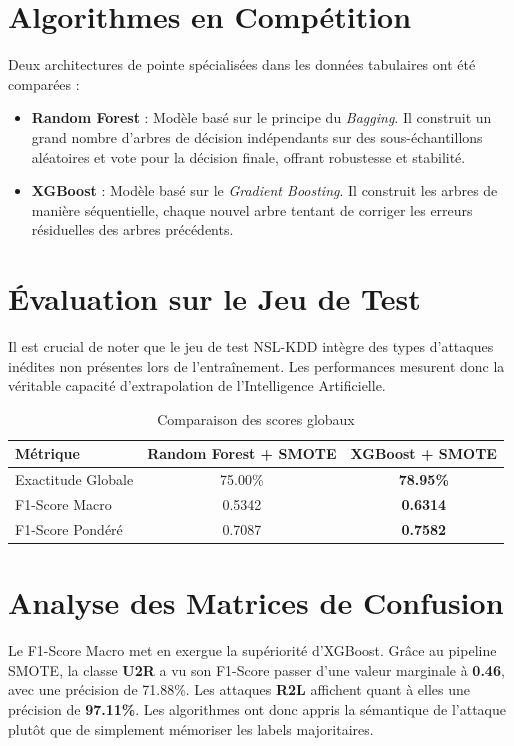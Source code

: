 \documentclass[12pt,a4paper]{report}
\begin{document}
\section{Algorithmes en Compétition}
Deux architectures de pointe spécialisées dans les données tabulaires ont été comparées :
\begin{itemize}
    \item \textbf{Random Forest} : Modèle basé sur le principe du \textit{Bagging}. Il construit un grand nombre d'arbres de décision indépendants sur des sous-échantillons aléatoires et vote pour la décision finale, offrant robustesse et stabilité.
    \item \textbf{XGBoost} : Modèle basé sur le \textit{Gradient Boosting}. Il construit les arbres de manière séquentielle, chaque nouvel arbre tentant de corriger les erreurs résiduelles des arbres précédents.
\end{itemize}

\section{Évaluation sur le Jeu de Test}
Il est crucial de noter que le jeu de test NSL-KDD intègre des types d'attaques inédites non présentes lors de l'entraînement. Les performances mesurent donc la véritable capacité d'extrapolation de l'Intelligence Artificielle.

\begin{table}[H]
    \centering
    \begin{tabular}{lcc}
        \toprule
        \textbf{Métrique} & \textbf{Random Forest + SMOTE} & \textbf{XGBoost + SMOTE} \\
        \midrule
        Exactitude Globale & 75.00\% & \textbf{78.95\%} \\
        F1-Score Macro & 0.5342 & \textbf{0.6314} \\
        F1-Score Pondéré & 0.7087 & \textbf{0.7582} \\
        \bottomrule
    \end{tabular}
    \caption{Comparaison des scores globaux}
\end{table}

\section{Analyse des Matrices de Confusion}
Le F1-Score Macro met en exergue la supériorité d'XGBoost. Grâce au pipeline SMOTE, la classe \textbf{U2R} a vu son F1-Score passer d'une valeur marginale à \textbf{0.46}, avec une précision de 71.88\%. Les attaques \textbf{R2L} affichent quant à elles une précision de \textbf{97.11\%}. Les algorithmes ont donc appris la sémantique de l'attaque plutôt que de simplement mémoriser les labels majoritaires.
\end{document}
